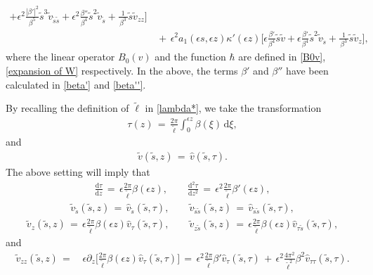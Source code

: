 \documentclass[10pt, reqno]{amsart}
\numberwithin{equation}{section}
\theoremstyle{definition}
\begin{document}
{\begin{align}
+ \epsilon^2 \frac{|\beta'|^2}{\beta^5} {\tilde s}^3{\tilde v}_{{\tilde s}{\tilde s}}
+ \epsilon^2 \frac{\beta''}{\beta^4} {\tilde s}^2 {\tilde v}_{\tilde s}
+\frac{1}{\, \beta^3\, } {\tilde s}{\tilde v}_{zz}
\Bigg]
\nonumber\\[2mm]
&\,+\,
\epsilon^2a_1(\epsilon s, \epsilon z) \kappa'(\epsilon z)
\Bigg[
\epsilon\frac{\beta'}{\beta^4} {\tilde s}{\tilde v}
+\epsilon\frac{\beta'}{\beta^4} {\tilde s}^2 {\tilde v}_{\tilde s}
+ \frac{1}{\, \beta^3\, } {\tilde s}{\tilde v}_z
\Bigg],
\end{align}
where the linear operator $B_0 (v)$ and the function $\hbar$ are defined in \eqref{B0v}, \eqref{expansion of W} respectively.
In the above, the terms $\beta'$ and $\beta''$ have been calculated in \eqref{beta'} and \eqref{beta''}.








\medskip
{}
By recalling the definition of ${\tilde\ell}$ in \eqref{lambda*}, we take the transformation
\begin{align}
 \tau (z) \,=\, \frac{2\pi}{\tilde\ell} \int_0^{\epsilon z} \beta (\xi) \,{\mathrm d} \xi,
\label{ztau}
\end{align}
 and
\begin{align}\label{definition of hat v}
{\tilde v}({\tilde s}, z)
\,=\, {\hat v}({\tilde s}, \tau).
\end{align}
The above setting will imply that
\begin{align*}
 \frac{{\mathrm d}\tau} {{\mathrm d}z}
 \,=\, \epsilon\frac{ 2\pi} {\tilde\ell} \beta (\epsilon z),
 \qquad
 \frac{{\mathrm d}^2 \tau} {{\mathrm d} z^2}
 \,=\, \epsilon^2\frac{ 2\pi} { {\tilde\ell}} \beta' (\epsilon z),
\end{align*}
\begin{align*}
{\tilde v}_{\tilde s}({\tilde s}, z) \,=\,{\hat v}_{\tilde s} ({\tilde s}, \tau),\qquad
{\tilde v}_{{\tilde s}{\tilde s}}({\tilde s}, z) \,=\,{\hat v}_{{\tilde s}{\tilde s}} ({\tilde s}, \tau),
\end{align*}
\begin{align*}
{\tilde v}_z ({\tilde s}, z)
\,=\,\epsilon\frac{2\pi}{{\tilde\ell}}\beta(\epsilon z){\hat v}_\tau ({\tilde s}, \tau),
\qquad
 {\tilde v}_{z{\tilde s}} ({\tilde s}, z)
\,=\, \epsilon\frac{2\pi}{{\tilde\ell}}\beta(\epsilon z){\hat v}_{\tau {\tilde s}} ({\tilde s}, \tau),
\end{align*}
and
\begin{align*}
{\tilde v}_{zz}({\tilde s}, z)
\,=\,
&\epsilon\partial_z\Big[\frac{2\pi}{{\tilde\ell}}\beta(\epsilon z){\hat v}_\tau ({\tilde s}, \tau)\Big]
\,=\,
\epsilon^2\frac{2\pi}{{\tilde\ell}}\beta'{\hat v}_\tau ({\tilde s}, \tau)
\,+\,\epsilon^2\frac{ 4\pi^2}{ {\tilde\ell^2}}\beta^2{\hat v}_{\tau\tau }({\tilde s}, \tau).
\end{align*}

}
\end{document}
